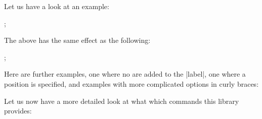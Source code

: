 Let us have a look at an example:
%
\begin{codeexample}[preamble={\usetikzlibrary{quotes}}]
\tikz {};
\end{codeexample}
%
The above has the same effect as the following:
%
\begin{codeexample}[]
\tikz {};
\end{codeexample}

Here are further examples, one where no  are added to the
|label|, one where a position is specified, and examples with more complicated
options in curly braces:
%
\begin{codeexample}[preamble={\usetikzlibrary{quotes}}]
\end{codeexample}

Let us now have a more detailed look at what which commands this library
provides:

